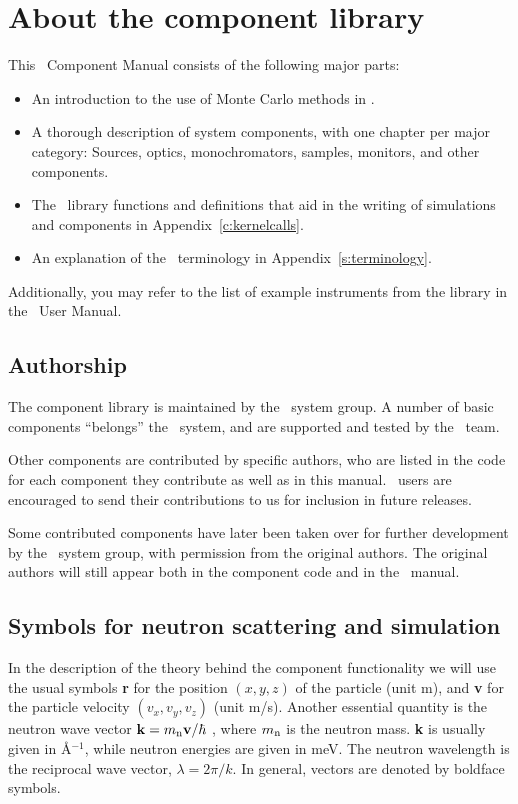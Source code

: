 
\chapter{About the component library}
\label{c:components}
This \MCS\ Component Manual consists of the following major parts:
\begin{itemize}
\item An introduction to the use of Monte Carlo methods in \MCS .
\item A thorough description of system components,
with one chapter per major category: Sources, optics,
monochromators, samples, monitors, and other components.
\item The \MCS\ library functions and definitions
  that aid in the writing of simulations and components in
  Appendix~\ref{c:kernelcalls}.
\item An explanation of the \MCS\ terminology in Appendix~\ref{s:terminology}.
\end{itemize}
Additionally, you may refer to the list of example instruments
from the library in the \MCS\ User Manual.

\section{Authorship}
The component library is
maintained by the \MCS\ system group. A number of basic components
``belongs'' the \MCS\ system, and are supported and tested by the \MCS\
team.

Other components are contributed
by specific authors, who are listed in the code for each component
they contribute as well as in this manual.
\MCS\ users are encouraged to send their
contributions to us for inclusion in future releases.

Some contributed components have later been taken over
for further development by the \MCS\ system
group, with permission from the original authors.
The original authors will still appear both in the component code and in the
\MCS\ manual.

\section{Symbols for neutron scattering and simulation}
In the description of the theory behind the component functionality
we will use the usual symbols {\bf r} for the position
$(x,y,z)$ of the particle (unit m), and {\bf v} for
the particle velocity $(v_x, v_y, v_z)$ (unit m/s).
Another essential quantity is the neutron wave vector
${\bf k} = m_{\rm n} {\bf v}/\hbar$ , where
$m_{\rm n}$ is the neutron mass. {\bf k} is usually given in
\AA$^{-1}$, while neutron energies are given in meV.
The neutron wavelength is the reciprocal wave vector,
$\lambda=2 \pi / k$.
In general, vectors are denoted by boldface symbols.


